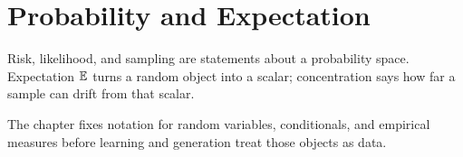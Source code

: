\chapter{Probability and Expectation}
\label{ch:probability}

Risk, likelihood, and sampling are statements about a probability space. Expectation $\mathbb{E}$ turns a random object into a scalar; concentration says how far a sample can drift from that scalar.

The chapter fixes notation for random variables, conditionals, and empirical measures before learning and generation treat those objects as data.
